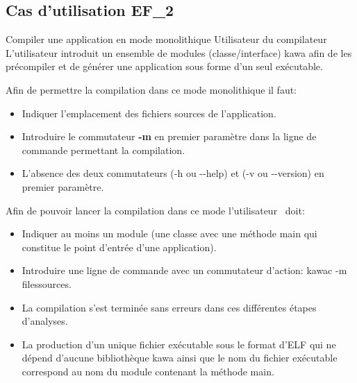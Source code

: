 \subsection{Cas d'utilisation EF\_2}
\fiche
{Compiler une application en mode monolithique}                    %
{Utilisateur du compilateur}                               %
{                                                %
  L'utilisateur introduit un ensemble de modules (classe/interface)
  kawa afin de les précompiler et de générer une application sous forme d'un seul exécutable.
}
{
	Afin de permettre la compilation dans ce mode monolithique il faut:
	\begin{itemize}
  	\item Indiquer l’emplacement des fichiers sources de l'application.
  	\item Introduire le commutateur  \textbf {-m}  en premier paramètre dans la ligne de commande permettant la compilation.
  	\item L'absence des deux commutateurs (-h ou -\hspace{0.1mm}-help) et (-v ou -\hspace{0.1mm}-version) en premier paramètre.
  	\end {itemize}
}                                                %
{

Afin de pouvoir lancer la compilation dans ce mode l'utilisateur  doit: 
\begin{itemize}
  	\item Indiquer au moins un module (une classe avec une méthode main qui constitue le point d'entrée d'une application).
  	\item Introduire une ligne de commande avec un commutateur d'action: kawac -m filessources.
 \end {itemize}

}    %
{
	\begin{itemize}
  	\item La compilation s'est terminée sans erreurs dans ces différentes étapes d’analyses.
  	\item La production d’un unique fichier exécutable sous le format d'ELF  qui ne dépend d'aucune bibliothèque kawa ainsi que le nom du fichier exécutable correspond au nom du module contenant la méthode main.
\end {itemize}
  
}  %
{                                                %
  
}
